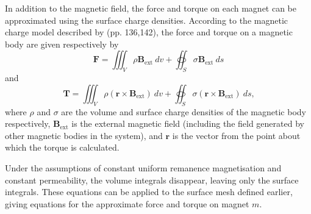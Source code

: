In addition to the magnetic field, the force and torque on each magnet can be approximated using the surface charge densities. According to the magnetic charge model described by \textcite{Furlani2001} (pp. 136,142), the force and torque on a magnetic body are given respectively by
\begin{equation}
	\mathbf{F} = \iiint_V \rho \mathbf{B}_\text{ext} \ dv + \oiint_S \sigma \mathbf{B}_\text{ext} \ ds
\end{equation}
and
\begin{equation}
	\mathbf{T} = \iiint_V \rho \left( \mathbf{r} \times \mathbf{B}_\text{ext} \right) \ dv + \oiint_S \sigma \left( \mathbf{r} \times \mathbf{B}_\text{ext} \right) \ ds \text{,}
\end{equation}
where \(\rho\) and \(\sigma\) are the volume and surface charge densities of the magnetic body respectively, \(\mathbf{B}_\text{ext}\) is the external magnetic field (including the field generated by other magnetic bodies in the system), and \(\mathbf{r}\) is the vector from the point about which the torque is calculated.

Under the assumptions of constant uniform remanence magnetisation and constant permeability, the volume integrals disappear, leaving only the surface integrals. These equations can be applied to the surface mesh defined earlier, giving equations for the approximate force and torque on magnet \(m\).

